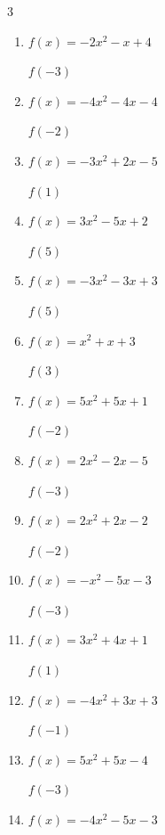 \begin{multicols}{3}
\begin{enumerate}
$f(-1)$
        \phantom{$= -7$}

  \item $f(x)=-2x^{2}-x+4$

$f(-3)$
        \phantom{$= -11$}

  \item $f(x)=-4x^{2}-4x-4$

$f(-2)$
        \phantom{$= -12$}

  \item $f(x)=-3x^{2}+2x-5$

$f(1)$
        \phantom{$= -6$}

  \item $f(x)=3x^{2}-5x+2$

$f(5)$
        \phantom{$= 52$}

  \item $f(x)=-3x^{2}-3x+3$

$f(5)$
        \phantom{$= -87$}

  \item $f(x)=x^{2}+x+3$

$f(3)$
        \phantom{$= 15$}

  \item $f(x)=5x^{2}+5x+1$

$f(-2)$
        \phantom{$= 11$}

  \item $f(x)=2x^{2}-2x-5$

$f(-3)$
        \phantom{$= 19$}

  \item $f(x)=2x^{2}+2x-2$

$f(-2)$
        \phantom{$= 2$}

  \item $f(x)=-x^{2}-5x-3$

$f(-3)$
        \phantom{$= 3$}

  \item $f(x)=3x^{2}+4x+1$

$f(1)$
        \phantom{$= 8$}

  \item $f(x)=-4x^{2}+3x+3$

$f(-1)$
        \phantom{$= -4$}

\columnbreak %

  \item $f(x)=5x^{2}+5x-4$

$f(-3)$
        \phantom{$= 26$}

  \item $f(x)=-4x^{2}-5x-3$


\end{enumerate}
\end{multicols}
